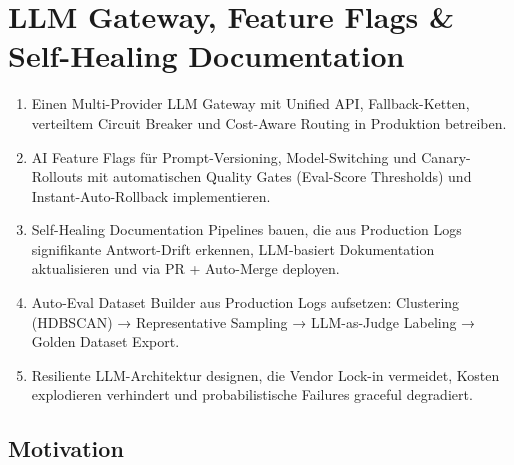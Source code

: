 \chapter{LLM Gateway, Feature Flags \& Self-Healing Documentation}
\label{chap:llm_gateway_featureflags}


\begin{lernzieleEnv}
\begin{enumerate}
    \item Einen Multi-Provider LLM Gateway mit Unified API, Fallback-Ketten, verteiltem Circuit Breaker und Cost-Aware Routing in Produktion betreiben.
    \item AI Feature Flags für Prompt-Versioning, Model-Switching und Canary-Rollouts mit automatischen Quality Gates (Eval-Score Thresholds) und Instant-Auto-Rollback implementieren.
    \item Self-Healing Documentation Pipelines bauen, die aus Production Logs signifikante Antwort-Drift erkennen, LLM-basiert Dokumentation aktualisieren und via PR + Auto-Merge deployen.
    \item Auto-Eval Dataset Builder aus Production Logs aufsetzen: Clustering (HDBSCAN) → Representative Sampling → LLM-as-Judge Labeling → Golden Dataset Export.
    \item Resiliente LLM-Architektur designen, die Vendor Lock-in vermeidet, Kosten explodieren verhindert und probabilistische Failures graceful degradiert.
\end{enumerate}
\end{lernzieleEnv}

\section{Motivation}

